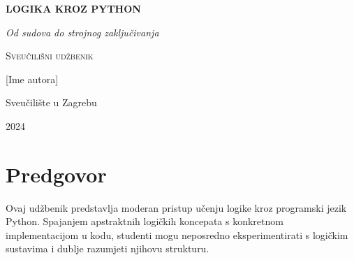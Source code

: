 \documentclass[11pt,a4paper,twoside,openright]{book}
\theoremstyle{definition}
\theoremstyle{plain}
\theoremstyle{remark}
\begin{document}
\frontmatter

\begin{titlepage}
    \centering
    \vspace*{2cm}
    
    {\Huge\bfseries\color{pythonblue} LOGIKA KROZ PYTHON\par}
    \vspace{1cm}
    {\Large\itshape Od sudova do strojnog zaključivanja\par}
    
    \vspace{3cm}
    
    
    \vspace{3cm}
    
    {\large\scshape Sveučilišni udžbenik\par}
    \vspace{1cm}
    {\large [Ime autora]\par}
    
    \vfill
    
    {\large Sveučilište u Zagrebu\par}
    {\large 2024\par}
\end{titlepage}

\tableofcontents

\chapter*{Predgovor}

Ovaj udžbenik predstavlja moderan pristup učenju logike kroz programski jezik Python. Spajanjem apstraktnih logičkih koncepata s konkretnom implementacijom u kodu, studenti mogu neposredno eksperimentirati s logičkim sustavima i dublje razumjeti njihovu strukturu.
\end{document}
